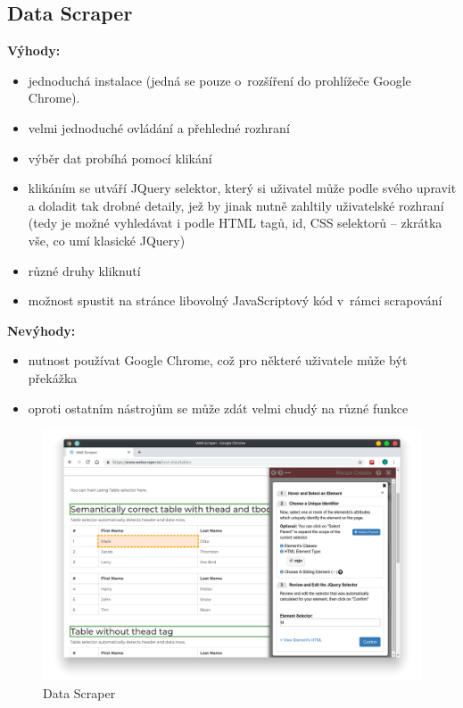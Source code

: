\documentclass[thesis=B,czech]{FITthesis}[2012/06/26]
\begin{document}
\subsection{Data Scraper}
\textbf{Výhody:}
\begin{itemize}
	\item jednoduchá instalace (jedná se pouze o~rozšíření do prohlížeče Google Chrome).
	\item velmi jednoduché ovládání a přehledné rozhraní
	\item výběr dat probíhá pomocí klikání
	\item klikáním se utváří JQuery selektor, který si uživatel může podle svého upravit a doladit tak drobné detaily, jež by jinak nutně zahltily uživatelské rozhraní (tedy je možné vyhledávat i podle HTML tagů, id, CSS selektorů -- zkrátka vše, co umí klasické JQuery)
	\item různé druhy kliknutí
	\item možnost spustit na stránce libovolný JavaScriptový kód v~rámci scrapování
\end{itemize}
\textbf{Nevýhody:}
\begin{itemize}
	\item nutnost používat Google Chrome, což pro některé uživatele může být překážka
	\item oproti ostatním nástrojům se může zdát velmi chudý na různé funkce
\end{itemize}
\begin{figure}
	\includegraphics[width=\linewidth]{images/DataScraper.png}
	\caption{Data Scraper}
	\label{fig:dataScraper}
\end{figure}

\end{document}

